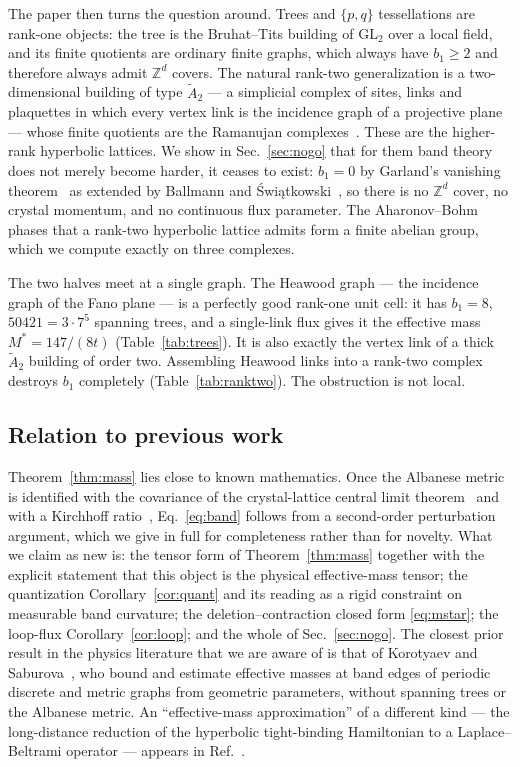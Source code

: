 \documentclass[aps,prb,reprint,amsmath,amssymb,floatfix,superscriptaddress]{revtex4-2}
\theoremstyle{plain}
\theoremstyle{definition}
\theoremstyle{remark}
\newcommand{\Z}{\mathbb{Z}}
\newcommand{\Atwo}{\widetilde A_2}
\begin{document}
The paper then turns the question around. Trees and $\{p,q\}$ tessellations are rank-one
objects: the tree is the Bruhat--Tits building of $\mathrm{GL}_2$ over a local field, and
its finite quotients are ordinary finite graphs, which always have $b_1\ge2$ and therefore
always admit $\Z^{d}$ covers. The natural rank-two generalization is a two-dimensional
building of type $\Atwo$ --- a simplicial complex of sites, links and plaquettes in which
every vertex link is the incidence graph of a projective plane --- whose finite quotients
are the Ramanujan complexes~\cite{LSV}. These are the higher-rank hyperbolic lattices. We
show in Sec.~\ref{sec:nogo} that for them band theory does not merely become harder, it
ceases to exist: $b_1=0$ by Garland's vanishing theorem~\cite{Ga} as extended by Ballmann
and \'Swi\k{a}tkowski~\cite{BSw}, so there is no $\Z^{d}$ cover, no crystal momentum, and no
continuous flux parameter. The Aharonov--Bohm phases that a rank-two hyperbolic lattice
admits form a finite abelian group, which we compute exactly on three complexes.

The two halves meet at a single graph. The Heawood graph --- the incidence graph of the
Fano plane --- is a perfectly good rank-one unit cell: it has $b_1=8$, $50421=3\cdot7^{5}$
spanning trees, and a single-link flux gives it the effective mass $M^{*}=147/(8t)$
(Table~\ref{tab:trees}). It is also exactly the vertex link of a thick $\Atwo$ building of
order two. Assembling Heawood links into a rank-two complex destroys $b_1$ completely
(Table~\ref{tab:ranktwo}). The obstruction is not local.

\subsection*{Relation to previous work}

Theorem~\ref{thm:mass} lies close to known mathematics. Once the Albanese metric is
identified with the covariance of the crystal-lattice central limit theorem~\cite{KS1} and
with a Kirchhoff ratio~\cite{KS3,BF}, Eq.~\eqref{eq:band} follows from a second-order
perturbation argument, which we give in full for completeness rather than for novelty. What
we claim as new is: the tensor form of Theorem~\ref{thm:mass} together with the explicit
statement that this object is the physical effective-mass tensor; the quantization
Corollary~\ref{cor:quant} and its reading as a rigid constraint on measurable band
curvature; the deletion--contraction closed form \eqref{eq:mstar}; the loop-flux
Corollary~\ref{cor:loop}; and the whole of Sec.~\ref{sec:nogo}. The closest prior result in
the physics literature that we are aware of is that of Korotyaev and Saburova~\cite{KorS},
who bound and estimate effective masses at band edges of periodic discrete and metric
graphs from geometric parameters, without spanning trees or the Albanese metric. An
``effective-mass approximation'' of a different kind --- the long-distance reduction of the
hyperbolic tight-binding Hamiltonian to a Laplace--Beltrami operator --- appears
in Ref.~.
\end{document}
